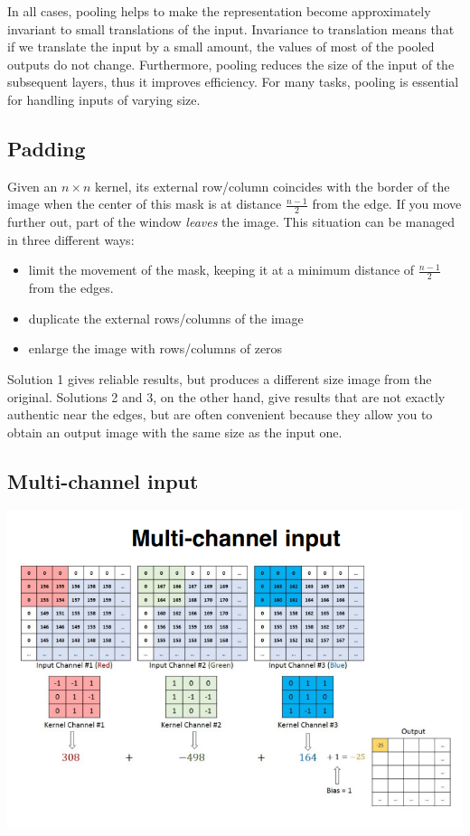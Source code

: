 In all cases, pooling helps to make the representation become approximately invariant to small translations of the input. Invariance to translation means that if we translate the input by a small amount, the values of most of the pooled outputs do not change. Furthermore, pooling reduces the size of the input of the subsequent layers, thus it improves efficiency.\newline\newline
For many tasks, pooling is essential for handling inputs of varying size.

\subsection{Padding}
Given an $n \times n$ kernel, its external row/column coincides with the border of the image when the center of this mask is at distance $\frac{n-1}{2}$ from the edge. If you move further out, part of the window \textit{leaves} the image.\newline
This situation can be managed in three different ways:
\begin{itemize}
    \item limit the movement of the mask, keeping it at a minimum distance of $\frac{n-1}{2}$ from the edges.
    \item duplicate the external rows/columns of the image
    \item enlarge the image with rows/columns of zeros
\end{itemize}
Solution 1 gives reliable results, but produces a different size image from the original. Solutions 2 and 3, on the other hand, give results that are not exactly authentic near the edges, but are often convenient because they allow you to obtain an output image with the same size as the input one.

\subsection{Multi-channel input}
\begin{center}
    \includegraphics[]{images/multi-channel input.png}
\end{center}


